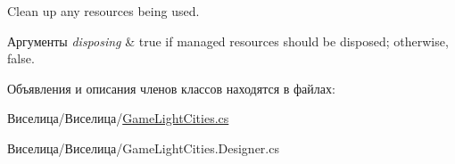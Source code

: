 Clean up any resources being used. 


\begin{DoxyParams}{Аргументы}
{\em disposing} & true if managed resources should be disposed; otherwise, false.\\
\hline
\end{DoxyParams}


Объявления и описания членов классов находятся в файлах\+:\begin{DoxyCompactItemize}
\item 
Виселица/Виселица/\hyperlink{_game_light_cities_8cs}{Game\+Light\+Cities.\+cs}\item 
Виселица/Виселица/Game\+Light\+Cities.\+Designer.\+cs\end{DoxyCompactItemize}
